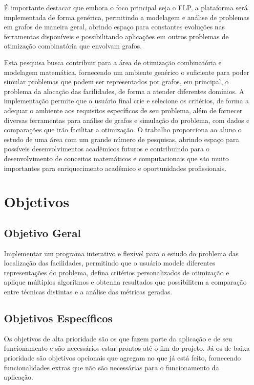 É importante destacar que embora o foco principal seja o FLP, a plataforma será implementada de forma genérica, permitindo a modelagem e análise de problemas em grafos de maneira geral, abrindo espaço para constantes evoluções nas ferramentas disponíveis e possibilitando aplicações em outros problemas de otimização combinatória que envolvam grafos.

Esta pesquisa busca contribuir para a área de otimização combinatória e modelagem matemática, fornecendo um ambiente genérico o suficiente para poder simular problemas que podem ser representados por grafos, em principal, o problema da alocação das facilidades, de forma a atender diferentes domínios. A implementação permite que o usuário final crie e selecione os critérios, de forma a adequar o ambiente aos requisitos específicos de seu problema, além de fornecer diversas ferramentas para análise de grafos e simulação do problema, com dados e comparações que irão facilitar a otimização. O trabalho proporciona ao aluno o estudo de uma área com um grande número de pesquisas, abrindo espaço para possíveis desenvolvimentos acadêmicos futuros e contribuindo para o desenvolvimento de conceitos matemáticos e computacionais que são muito importantes para enriquecimento acadêmico e oportunidades profissionais.



\section{Objetivos}

\subsection{Objetivo Geral}
Implementar um programa interativo e flexível para o estudo do problema das localização das facilidades, permitindo que o usuário modele diferentes representações do problema, defina critérios personalizados de otimização e aplique múltiplos algoritmos e obtenha resultados que possibilitem a comparação entre técnicas distintas e a análise das métricas geradas.

\subsection{Objetivos Específicos}
Os objetivos de alta prioridade são os que fazem parte da aplicação e de seu funcionamento e são necessários estar prontos até o fim do projeto. Já os de baixa prioridade são objetivos opcionais que agregam no que já está feito, fornecendo funcionalidades extras que não são necessárias para o funcionamento da aplicação.
 
